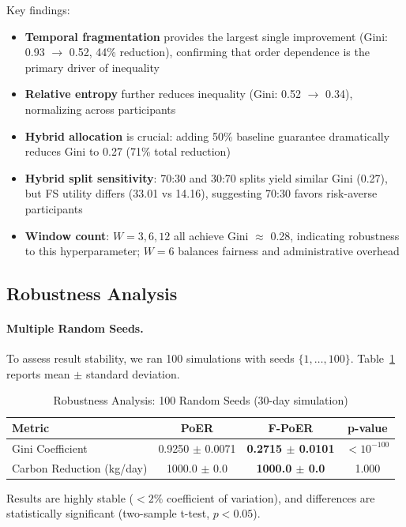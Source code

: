 \documentclass[12pt,a4paper]{article}
\begin{document}
Key findings:
\begin{itemize}
    \item \textbf{Temporal fragmentation} provides the largest single improvement (Gini: 0.93 $\rightarrow$ 0.52, 44\% reduction), confirming that order dependence is the primary driver of inequality
    \item \textbf{Relative entropy} further reduces inequality (Gini: 0.52 $\rightarrow$ 0.34), normalizing across participants
    \item \textbf{Hybrid allocation} is crucial: adding 50\% baseline guarantee dramatically reduces Gini to 0.27 (71\% total reduction)
    \item \textbf{Hybrid split sensitivity}: 70:30 and 30:70 splits yield similar Gini (0.27), but FS utility differs (33.01 vs 14.16), suggesting 70:30 favors risk-averse participants
    \item \textbf{Window count}: $W=3,6,12$ all achieve Gini $\approx$ 0.28, indicating robustness to this hyperparameter; $W=6$ balances fairness and administrative overhead
\end{itemize}

\subsection{Robustness Analysis}

\paragraph{Multiple Random Seeds.} To assess result stability, we ran 100 simulations with seeds $\{1, \ldots, 100\}$. Table~\ref{tab:robustness} reports mean $\pm$ standard deviation.

\begin{table}[h]
\centering
\caption{Robustness Analysis: 100 Random Seeds (30-day simulation)}
\label{tab:robustness}
\begin{tabular}{lccc}
\toprule
\textbf{Metric} & \textbf{PoER} & \textbf{F-PoER} & \textbf{p-value} \\
\midrule
Gini Coefficient & 0.9250 $\pm$ 0.0071 & \textbf{0.2715 $\pm$ 0.0101} & $< 10^{-100}$ \\
Carbon Reduction (kg/day) & 1000.0 $\pm$ 0.0 & \textbf{1000.0 $\pm$ 0.0} & 1.000 \\
\bottomrule
\end{tabular}
\end{table}

Results are highly stable ($<2\%$ coefficient of variation), and differences are statistically significant (two-sample t-test, $p < 0.05$).
\end{document}
